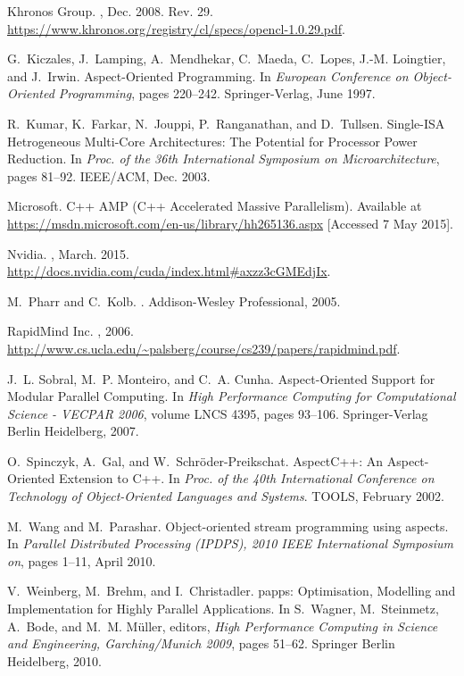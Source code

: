 \documentclass{sig-alternate-05-2015}
\begin{document}
\begin{thebibliography}{10}
Khronos Group.
, Dec. 2008.
\newblock Rev. 29.
  \url{https://www.khronos.org/registry/cl/specs/opencl-1.0.29.pdf}.

G.~Kiczales, J.~Lamping, A.~Mendhekar, C.~Maeda, C.~Lopes, J.-M. Loingtier, and
  J.~Irwin.
\newblock Aspect-{O}riented {P}rogramming.
\newblock In {\em European Conference on Object-Oriented Programming}, pages
  220--242. Springer-Verlag, June 1997.

R.~Kumar, K.~Farkar, N.~Jouppi, P.~Ranganathan, and D.~Tullsen.
\newblock Single-{ISA} {H}etrogeneous {M}ulti-{C}ore {A}rchitectures: {T}he
  {P}otential for {P}rocessor {P}ower {R}eduction.
\newblock In {\em Proc. of the 36th International Symposium on
  Microarchitecture}, pages 81--92. IEEE/ACM, Dec. 2003.

Microsoft.
\newblock C++ {AMP} ({C}++ {A}ccelerated {M}assive {P}arallelism).
\newblock Available at
  \url{https://msdn.microsoft.com/en-us/library/hh265136.aspx} [Accessed 7 May
  2015].

Nvidia.
, March. 2015.
\newblock \url{http://docs.nvidia.com/cuda/index.html#axzz3cGMEdjIx}.

M.~Pharr and C.~Kolb.
.
\newblock Addison-Wesley Professional, 2005.

RapidMind Inc.
, 2006.
\newblock
  \url{http://www.cs.ucla.edu/~palsberg/course/cs239/papers/rapidmind.pdf}.

J.~L. Sobral, M.~P. Monteiro, and C.~A. Cunha.
\newblock Aspect-{O}riented {S}upport for {M}odular {P}arallel {C}omputing.
\newblock In {\em High Performance Computing for Computational Science - VECPAR
  2006}, volume LNCS 4395, pages 93--106. Springer-Verlag Berlin Heidelberg,
  2007.

O.~Spinczyk, A.~Gal, and W.~Schr{\"{o}}der-Preikschat.
\newblock Aspect{C}++: {A}n {A}spect-{O}riented {E}xtension to {C}++.
\newblock In {\em Proc. of the 40th International Conference on Technology of
  Object-Oriented Languages and Systems}. TOOLS, February 2002.

M.~Wang and M.~Parashar.
\newblock Object-oriented stream programming using aspects.
\newblock In {\em Parallel Distributed Processing (IPDPS), 2010 IEEE
  International Symposium on}, pages 1--11, April 2010.

V.~Weinberg, M.~Brehm, and I.~Christadler.
papps: {O}ptimisation, {M}odelling and {I}mplementation for
  {H}ighly {P}arallel {A}pplications.
\newblock In S.~Wagner, M.~Steinmetz, A.~Bode, and M.~M. M{\"{u}}ller, editors,
  {\em High Performance Computing in Science and Engineering, Garching/Munich
  2009}, pages 51--62. Springer Berlin Heidelberg, 2010.

\end{thebibliography}

\end{document}
